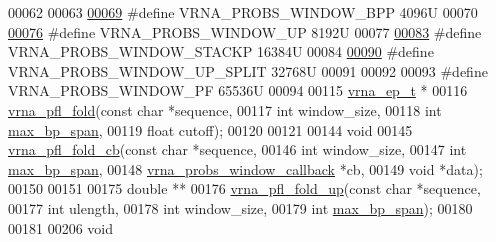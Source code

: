 \begin{DoxyCode}
00062 
00063 
\hyperlink{group__local__pf__fold_ga296217b76e76e5f7e6927e7210aa9b1f}{00069} \textcolor{preprocessor}{#define VRNA\_PROBS\_WINDOW\_BPP  4096U}
00070 
\hyperlink{group__local__pf__fold_ga18325811c7dfc7b7d9d4ac37f4353615}{00076} \textcolor{preprocessor}{#define VRNA\_PROBS\_WINDOW\_UP   8192U}
00077 
\hyperlink{group__local__pf__fold_ga0a13fc668b02f21b225e2334e4caac08}{00083} \textcolor{preprocessor}{#define VRNA\_PROBS\_WINDOW\_STACKP   16384U}
00084 
\hyperlink{group__local__pf__fold_ga9068f4ec008bf1c042a9357f5c2c5e13}{00090} \textcolor{preprocessor}{#define VRNA\_PROBS\_WINDOW\_UP\_SPLIT   32768U}
00091 
00092 
00093 \textcolor{preprocessor}{#define VRNA\_PROBS\_WINDOW\_PF        65536U}
00094 
00115 \hyperlink{group__struct__utils_structvrna__elem__prob__s}{vrna\_ep\_t} *
00116 \hyperlink{group__local__pf__fold_ga6267230f20cab0e2315375310b4dad85}{vrna\_pfl\_fold}(\textcolor{keyword}{const} \textcolor{keywordtype}{char}  *sequence,
00117               \textcolor{keywordtype}{int}         window\_size,
00118               \textcolor{keywordtype}{int}         \hyperlink{group__model__details_ga18df869af0d70101106458fc3f027806}{max\_bp\_span},
00119               \textcolor{keywordtype}{float}       cutoff);
00120 
00121 
00144 \textcolor{keywordtype}{void}
00145 \hyperlink{group__local__pf__fold_ga8dc3788e66420f524f2bfc0b685a939d}{vrna\_pfl\_fold\_cb}(\textcolor{keyword}{const} \textcolor{keywordtype}{char}                 *sequence,
00146                  \textcolor{keywordtype}{int}                        window\_size,
00147                  \textcolor{keywordtype}{int}                        \hyperlink{group__model__details_ga18df869af0d70101106458fc3f027806}{max\_bp\_span},
00148                  \hyperlink{LPfold_8h_abe710a1182e6db69cc75329dfc9bed67}{vrna\_probs\_window\_callback} *cb,
00149                  \textcolor{keywordtype}{void}                       *data);
00150 
00151 
00175 \textcolor{keywordtype}{double} **
00176 \hyperlink{group__local__pf__fold_ga1dd5c51b797c961124912e289bff553a}{vrna\_pfl\_fold\_up}(\textcolor{keyword}{const} \textcolor{keywordtype}{char} *sequence,
00177                  \textcolor{keywordtype}{int}        ulength,
00178                  \textcolor{keywordtype}{int}        window\_size,
00179                  \textcolor{keywordtype}{int}        \hyperlink{group__model__details_ga18df869af0d70101106458fc3f027806}{max\_bp\_span});
00180 
00181 
00206 \textcolor{keywordtype}{void}

\end{DoxyCode}
